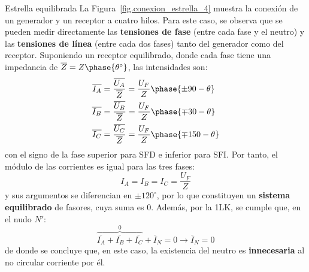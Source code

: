 \documentclass[11pt]{book} %
\makeatletter
\numberwithin{dummy}{section}
\theoremstyle{ocrenumbox}
\theoremstyle{blacknumex}
\theoremstyle{blacknumbox}
\theoremstyle{ocrenum}
\renewcommand{\subsubsection}{\@startsection {subsubsection}{3}{\z@}
{-2ex \@plus -0.1ex \@minus -.2ex}
{.2ex \@plus.2ex }
{\normalfont\small\sffamily\bfseries}}
\makeatother
\begin{document}
	\subsubsection{Estrella equilibrada}
	La Figura~\ref{fig.conexion_estrella_4} muestra la conexión de un generador y un receptor a cuatro hilos. Para este caso, se observa que se pueden medir directamente las \textbf{tensiones de fase} (entre cada fase y el neutro) y las \textbf{tensiones de línea} (entre cada dos fases) tanto del generador como del receptor. Suponiendo un receptor equilibrado, donde cada fase tiene una impedancia de $\overline{Z}=Z\phase{\theta^\circ}$, las intensidades son:
	\begin{align*}
      \overline{I_A} &= \dfrac{\overline{U_A}}{\overline{Z}} = \dfrac{U_F}{Z}\phase{\pm 90 - \theta} \\
      \overline{I_B} &= \frac{\overline{U_B}}{\overline{Z}} = \frac{U_F}{Z}\phase{{\mp 30} - \theta}\\
      \overline{I_C} &= \frac{\overline{U_C}}{\overline{Z}} = \frac{U_F}{Z}\phase{{\mp 150} - \theta}
    \end{align*}
    con el signo de la fase superior para SFD e inferior para SFI. Por tanto, el módulo de las corrientes es igual para las tres fases: 
    \begin{equation}
        \boxed{I_A = I_B = I_C = \dfrac{U_F}{Z}}
    \end{equation}
    y sus argumentos se diferencian en $\pm120^\circ$, por lo que constituyen un \textbf{sistema equilibrado} de fasores, cuya suma es 0. Además, por la 1LK, se cumple que, en el nudo $N'$: 
    \begin{equation}
        \overbrace{\overline{I_A}  + \overline{I_B} + \overline{I_C}}^0 + \overline{I}_N = 0\rightarrow \boxed{\overline{I}_N = 0}
    \end{equation}
    de donde se concluye que, en este caso, la existencia del neutro es \textbf{innecesaria} al no circular corriente por él. 
\end{document}
